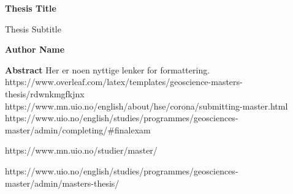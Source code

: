
\thispagestyle{plain}
\begin{center}
    \Large
    \textbf{Thesis Title}
        
    \vspace{0.4cm}
    \large
    Thesis Subtitle
        
    \vspace{0.4cm}
    \textbf{Author Name}
       
    \vspace{0.9cm}
    \textbf{Abstract}
    Her er noen nyttige lenker for formattering.
    https://www.overleaf.com/latex/templates/geoscience-masters-thesis/rdwnkmgfkjnx
    https://www.mn.uio.no/english/about/hse/corona/submitting-master.html
    https://www.uio.no/english/studies/programmes/geosciences-master/admin/completing/#finalexam
    
    https://www.mn.uio.no/studier/master/
    
    https://www.uio.no/english/studies/programmes/geosciences-master/admin/masters-thesis/
    
\end{center}